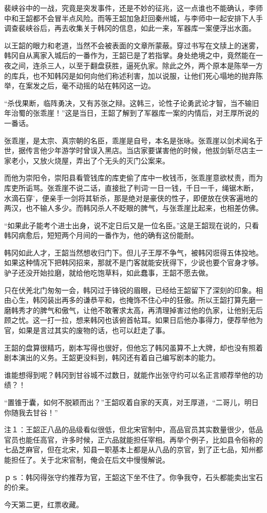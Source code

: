 裴峡谷中的一战，究竟是突发事件，还是不妙的征兆，这一点谁也不能确认，李师中和王韶都不会冒半点风险。而等王韶加急赶回秦州城，与李师中一起安排下人手调查裴峡谷后，再去收集关于韩冈的信息，如此一来，军器库一案便浮出水面。

以王韶的眼力和老道，当然不会被表面的文章所蒙蔽。穿过书写在文牍上的迷雾，韩冈自从离家入城后的一番作为，王韶已是了若指掌。身处绝境之中，竟然能在一夜之间，连杀三人，以至于翻盘获胜，逼死仇家。除此之外，两个原本是陈举一方的库兵，也不知韩冈是如何向他们称述利害，加以说服，让他们死心塌地的抛弃陈举，在案发之后，毫不动摇的站在韩冈这一边。

“杀伐果断，临阵勇决，又有苏张之辩。这韩三，论性子论勇武论才智，当不输旧年治蜀的张乖崖！”这是当日，王韶了解到了军器库一案的内情后，对王厚所说的一番话。

张乖崖，是太宗、真宗朝的名臣，乖崖是自号，本名是张咏。张乖崖以剑术闻名于世，据传言他少年游学时曾误入黑店。当店家要谋害他的时候，他拔剑斩尽店主一家老小，又放火烧屋，弄出了个无头的灭门公案来。

而他为崇阳令，崇阳县看管钱库的库吏偷了库中一枚钱币，张乖崖意欲杖责，而为库吏所诟骂。张乖崖不说二话，直接批了判词‘一日一钱，千日一千，绳锯木断，水滴石穿’，便亲手一剑将其斩杀，那是绝对是豪侠的性子，即便放在侠客遍地的两汉，也不输人多少。而韩冈杀人不眨眼的脾气，与张乖崖比起来，也相差仿佛。

“如果此子能考个进士出身，说不定日后又是一位名臣。”这是王韶现在说的，只看韩冈病愈后，短短两个月间的一番作为，他的确有这份能耐。

韩冈如此人才，王韶当然想收归门下。但儿子王厚不争气，被韩冈诳得五体投地。如果这种情况下把韩冈招来，那就不是门客就能安抚得下，少说也要个官身才够。驴子还没开始拉磨，就给他吃饱草料，如此蠢事，王韶不愿去做。

只在伏羌北门匆匆一会，韩冈过于锋锐的眉眼，已经给王韶留下了深刻的印象。相由心生，韩冈装出再多的谦恭平和，也掩饰不住心中的狂傲。所以王韶打算先磨一磨韩秀才的脾气和傲气，让他不敢奢求太高，再清理掉害过他的仇家，让他别无后顾之忧。这一打一拉，想来韩冈也该俯首帖耳。如果日后他办事得力，便荐举他为官，如果是言过其实的废物的话，也可以赶走了事。

王韶的盘算很精巧，剧本写得也很好，但他忘了韩冈虽算不上大牌，却也没有照着剧本演出的义务。王韶更没料到，韩冈还有着自己编写剧本的能力。

谁能想得到呢？韩冈到甘谷城不过数日，就能作出张守约可以名正言顺荐举他的功绩？！

“置锥于囊，如何不脱颖而出？”王韶叹着自家的天真，对王厚道，“二哥儿，明日你随我去甘谷！”

注１：王韶正八品的品级看似很低，但北宋官制中，高品官员其实数量很少，低品官员也能任高官，许多时候，正六品就能担任宰相。再举个例子，比如县令俗称的七品芝麻官，但在北宋，知县一职基本上都是从八品的京官，到了正七品，知州都能担任了。关于北宋官制，俺会在后文中慢慢解说。

ｐｓ：韩冈得张守约推荐为官，王韶这下坐不住了。你争我夺，石头都能卖出宝石的价来。

今天第二更，红票收藏。

